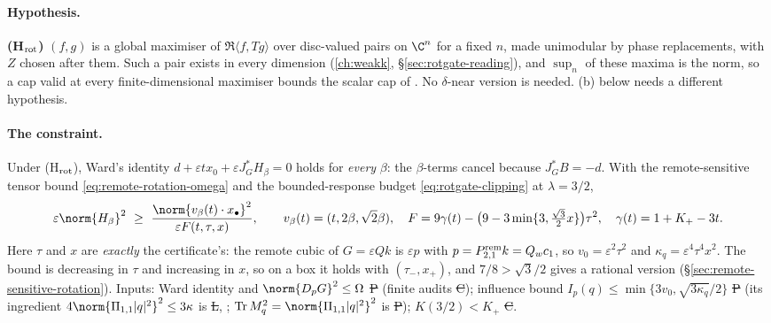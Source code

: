 \paragraph{Hypothesis.} \textbf{(H$_{\rm rot}$)} $(f,g)$ is a global maximiser of $\Re\langle f,Tg\rangle$ over disc-valued pairs on $\C^n$ for a fixed $n$, made unimodular by phase
replacements, with $Z$ chosen after them. Such a pair exists in every dimension (\autoref{ch:weakk}, \S\ref{sec:rotgate-reading}), and $\sup_n$ of these maxima is the norm,
so a cap valid at every finite-dimensional maximiser bounds the scalar cap of . No $\delta$-near version is needed. (b) below needs a different hypothesis.

\paragraph{The constraint.} Under (H$_{\rm rot}$), Ward's identity $d+\varepsilon t x_0+\varepsilon J_G^*H_\beta=0$ holds for \emph{every} $\beta$: the $\beta$-terms cancel because
$J_G^*B=-d$. With the remote-sensitive tensor bound \eqref{eq:remote-rotation-omega} and the bounded-response budget \eqref{eq:rotgate-clipping} at $\lambda=3/2$,
\begin{equation}\label{eq:nm-ward}
\varepsilon\norm{H_\beta}^2\ \ge\ \frac{\norm{v_\beta(t)\cdot x_\bullet}^2}{\varepsilon F(t,\tau,x)},\qquad v_\beta(t)=(t,2\beta,\sqrt2\beta),\quad
F=9\gamma(t)-\bigl(9-3\min\{3,\tfrac{\sqrt3}2x\}\bigr)\tau^2,\quad\gamma(t)=1+K_+-3t .
\end{equation}
Here $\tau$ and $x$ are \emph{exactly} the certificate's: the remote cubic of $G=\varepsilon Qk$ is $\varepsilon p$ with $p=P^{\rm rem}_{2,1}k=Q_wc_1$, so $v_0=\varepsilon^2\tau^2$ and
$\kappa_q=\varepsilon^4\tau^4x^2$. The bound is decreasing in $\tau$ and increasing in $x$, so on a box it holds with $(\tau_-,x_+)$, and $7/8>\sqrt3/2$ gives a rational version
(\S\ref{sec:remote-sensitive-rotation}). Inputs: Ward identity and $\norm{D_pG}^2\le\Omega$ \st{P} (finite audits \st{C}); influence bound $I_p(q)\le\min\{3v_0,\sqrt{3\kappa_q}/2\}$
\st{P} (its ingredient $4\norm{\Pi_{1,1}|q|^2}^2\le3\kappa$ is \st{L}, ; $\operatorname{Tr}M_q^2=\norm{\Pi_{1,1}|q|^2}^2$ is \st{P}); $K(3/2)<K_+$ \st{C}.

